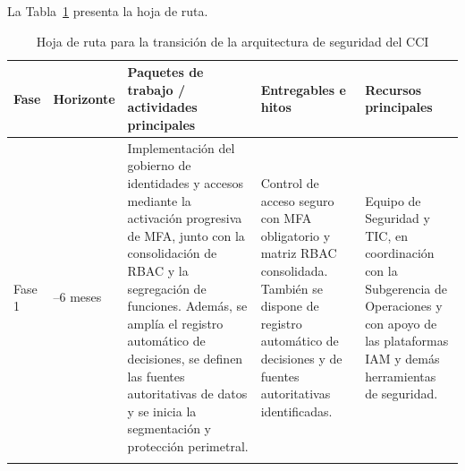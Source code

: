 La Tabla~\ref{tab:roadmap_cci} presenta la hoja de ruta.

\begin{table}[H]
	\centering
	\caption{Hoja de ruta para la transición de la arquitectura de seguridad del CCI}
	\label{tab:roadmap_cci}
	\scriptsize
	\setlength{\tabcolsep}{3.5pt}
	\renewcommand{\arraystretch}{1.2}

	\begin{tabularx}{\textwidth}{
			>{\raggedright\arraybackslash}p{1.6cm}
			>{\centering\arraybackslash}p{1.6cm}
			>{\raggedright\arraybackslash}X
			>{\raggedright\arraybackslash}X
			>{\raggedright\arraybackslash}p{2.7cm}}

		\toprule
		\textbf{Fase}                                                                          &
		\textbf{Horizonte}                                                                     &
		\textbf{Paquetes de trabajo / actividades principales}                                 &
		\textbf{Entregables e hitos}                                                           &
		\textbf{Recursos principales}                                                            \\
		\midrule

		Fase 1                                                                                 &
		0--6 meses                                                                             &
		Implementación del gobierno de identidades y accesos mediante la activación progresiva
		de MFA, junto con la consolidación de RBAC y la segregación de funciones. Además, se
		amplía el registro automático de decisiones, se definen las fuentes autoritativas de
		datos y se inicia la segmentación y protección perimetral.                             &
		Control de acceso seguro con MFA obligatorio y matriz RBAC consolidada. También se
		dispone de registro automático de decisiones y de fuentes autoritativas identificadas. &
		Equipo de Seguridad y TIC, en coordinación con la Subgerencia de Operaciones y con
		apoyo de las plataformas IAM y demás herramientas de seguridad.                          \\

		\addlinespace


\end{tabularx}
\end{table}
